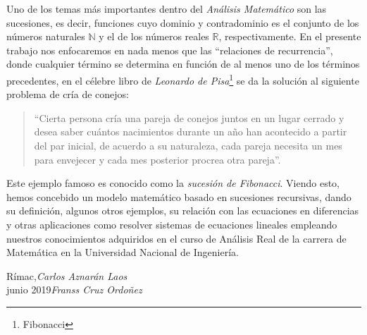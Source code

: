 \preface
Uno de los temas más importantes dentro del \emph{Análisis Matemático} son las sucesiones, es decir, funciones cuyo dominio y contradominio es el conjunto de los números naturales $\mathds{N}$ y el de los números reales $\mathds{R}$, respectivamente. En el presente trabajo nos enfocaremos en nada menos que las ``relaciones de recurrencia'', donde cualquier  término se determina en función de al menos uno de los términos precedentes, en el célebre libro \cite[ver pág. 404]{sigler2003fibonacci} de \emph{Leonardo de Pisa}\footnote{Fibonacci} se da la solución al siguiente problema de cría de conejos:
\begin{quote}
	``Cierta persona cría una pareja de conejos juntos en un lugar cerrado y desea saber cuántos nacimientos durante un año han acontecido a partir del par inicial, de acuerdo a su naturaleza, cada pareja necesita un mes para envejecer y cada mes posterior procrea otra pareja''.
\end{quote}
Este ejemplo famoso es conocido como la \emph{sucesión de Fibonacci}. Viendo esto, hemos concebido un modelo matemático basado en sucesiones recursivas, dando su definición, algunos otros ejemplos, su relación con las ecuaciones en diferencias y otras aplicaciones como resolver sistemas de ecuaciones lineales empleando nuestros conocimientos adquiridos en el curso de Análisis Real de la carrera de Matemática en la Universidad
Nacional de Ingeniería.
\vspace{\baselineskip}
\begin{flushright}\noindent
Rímac,\hfill {\it Carlos Aznarán Laos}\\
junio 2019\hfill {\it Franss Cruz Ordoñez}\\
\end{flushright}